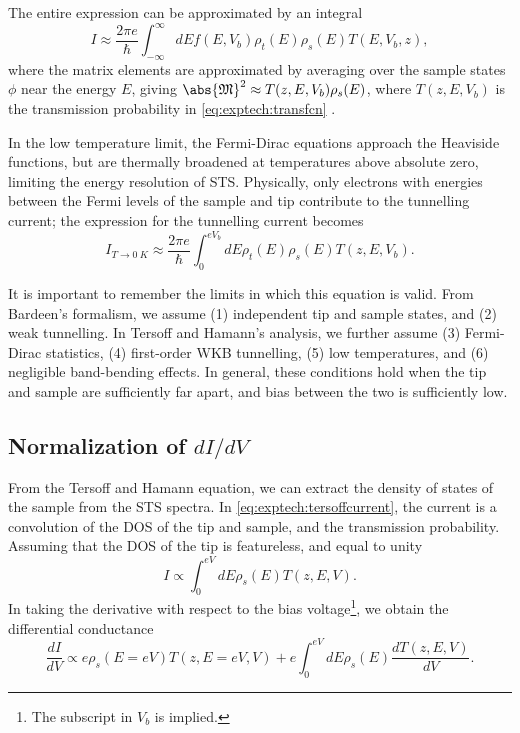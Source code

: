 The entire expression can be approximated by an integral
\begin{equation}
    I \approx \frac{2\pi e}{\hbar} \int_{-\infty}^\infty dE f(E,V_b) \rho_t(E)\rho_s(E) T(E,V_b,z),
\end{equation}
where the matrix elements are approximated by averaging over the sample states $\phi$ near the energy $E$, giving $\abs{\mathfrak{M}}^2 \approx T(z,E,V_b) \rho_s(E)$, where $T(z,E,V_b)$ is the transmission probability in \autoref{eq:exptech:transfcn} .

In the low temperature limit, the Fermi-Dirac equations approach the Heaviside functions, but are thermally broadened at temperatures above absolute zero, limiting the energy resolution of \ac{STS}. Physically, only electrons with energies between the Fermi levels of the sample and tip contribute to the tunnelling current; the expression for the tunnelling current becomes
\begin{equation} \label{eq:exptech:tersoffcurrent}
I_{T \rightarrow \SI{0}{K}} \approx \frac{2\pi e}{\hbar} \int_{0} ^{eV_b} dE \rho_{t}(E) \rho_{s}(E) T(z,E,V_b).
\end{equation}

It is important to remember the limits in which this equation is valid. From Bardeen's formalism, we assume (1) independent tip and sample states, and (2) weak tunnelling. In Tersoff and Hamann's analysis, we further assume (3) Fermi-Dirac statistics, (4) first-order \ac{WKB} tunnelling, (5) low temperatures, and (6) negligible band-bending effects. In general, these conditions hold when the tip and sample are sufficiently far apart, and bias between the two is sufficiently low.


\subsection{Normalization of $dI/dV$}

From the Tersoff and Hamann equation, we can extract the density of states of the sample from the \ac{STS} spectra. In \autoref{eq:exptech:tersoffcurrent}, the current is a convolution of the \ac{DOS} of the tip and sample, and the transmission probability. Assuming that the \ac{DOS} of the tip is featureless, and equal to unity
\begin{equation}
I \propto \int_0 ^{eV} dE \rho_s(E) T(z,E,V) .
\end{equation}
In taking the derivative with respect to the bias voltage\footnote{The subscript in $V_b$ is implied.}, we obtain the differential conductance
\begin{equation} \label{eq:exptech:didv}
\frac{dI}{dV} \propto e \rho_s(E=eV) T(z,E=eV,V) + e \int_0^{eV} dE \rho_s(E) \frac{dT(z,E,V)}{dV}  .
\end{equation}

